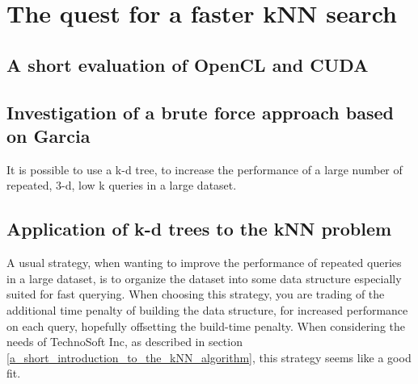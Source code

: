 
\chapter{The quest for a faster kNN search} %
\label{sec:the_quest_for_a_faster_knn_search}

\section{A short evaluation of OpenCL and CUDA} %
\label{sub:a_short_evaluation_of_opencl_and_cuda}


\section{Investigation of a brute force approach based on Garcia} %
\label{sub:investigation_of_a_brute_force_approach_based_on_garcia}


\begin{myrq}
\label{rq:structure_aml}
    It is possible to use a k-d tree, to increase the performance of a large number of repeated, 3-d, low k queries in a large dataset.
\end{myrq}

\section{Application of k-d trees to the kNN problem} %
\label{sub:application_of_kd_trees_to_the_knn_problem}

A usual strategy, when wanting to improve the performance of repeated queries in a large dataset, is to organize the dataset into some data structure especially suited for fast querying. When choosing this strategy, you are trading of the additional time penalty of building the data structure, for increased performance on each query, hopefully offsetting the build-time penalty. When considering the needs of TechnoSoft Inc, as described in section \ref{a_short_introduction_to_the_kNN_algorithm}, this strategy seems like a good fit.

